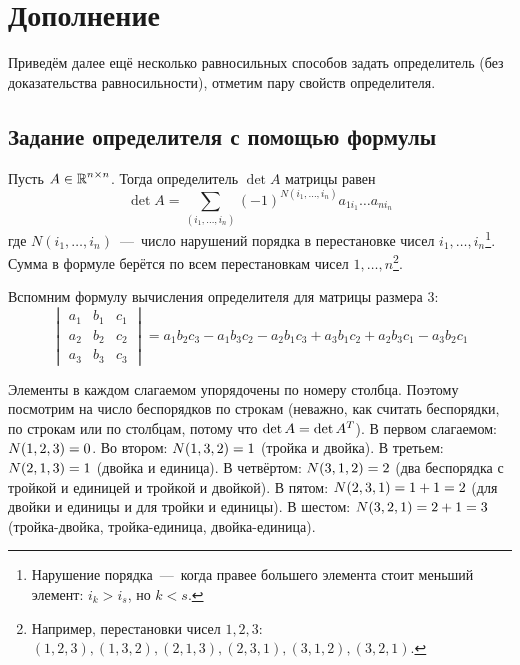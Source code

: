 \documentclass[a4paper,12pt]{article}
\begin{document}
  
  \newpage
  
  
  \section{Дополнение}
  
  Приведём далее ещё несколько равносильных способов задать определитель (без доказательства равносильности), отметим пару свойств определителя.
  
  \subsection{Задание определителя с помощью формулы}
  
  \begin{theorem}\label{theor:complete-expansion}
    Пусть $A \in \operatorname{\mathbb R}^{n \times n}$.
    Тогда определитель $\det A$ матрицы равен
    \begin{equation}
      \label{eq:complete-expansion}
      \det A = \sum_{(i_1, \ldots, i_n)} (-1)^{N(i_1, \ldots, i_n)} a_{1 i_1} \ldots a_{n i_n}
    \end{equation}
    где $N(i_1, \ldots, i_n)$~---~число нарушений порядка в перестановке чисел $i_1, \ldots, i_n$\footnote{Нарушение порядка~---~когда правее большего элемента стоит меньший элемент: $i_k > i_s$, но $k < s$.}.
    Сумма в формуле берётся по всем перестановкам чисел $1, \ldots, n$\footnote{Например, перестановки чисел $1, 2, 3$: $(1, 2, 3), (1, 3, 2), (2, 1, 3), (2, 3, 1), (3, 1, 2), (3, 2, 1)$.}.
  \end{theorem}
  
  \begin{example}
    Вспомним формулу вычисления определителя для матрицы размера $3$:
    \begin{equation*}
      \begin{vmatrix}
        a_1 & b_1 & c_1\\
        a_2 & b_2 & c_2\\
        a_3 & b_3 & c_3
      \end{vmatrix}
        = a_1 b_2 c_3 - a_1 b_3 c_2 - a_2 b_1 c_3 + a_3 b_1 c_2 + a_2 b_3 c_1 - a_3 b_2 c_1
    \end{equation*}
    
    Элементы в каждом слагаемом упорядочены по номеру столбца.
    Поэтому посмотрим на число беспорядков по строкам (неважно, как считать беспорядки, по строкам или по столбцам, потому что $\det A \hm= \det A^T$).
    В первом слагаемом: $N(1, 2, 3) \hm= 0$.
    Во втором: $N(1, 3, 2) \hm= 1$ (тройка и двойка).
    В третьем: $N(2, 1, 3) \hm= 1$ (двойка и единица).
    В четвёртом: $N(3, 1, 2) \hm= 2$ (два беспорядка с тройкой и единицей и тройкой и двойкой).
    В пятом: $N(2, 3, 1) \hm= 1 \hm+ 1 \hm= 2$ (для двойки и единицы и для тройки и единицы).
    В шестом: $N(3, 2, 1) \hm= 2 \hm+ 1 \hm= 3$ (тройка-двойка, тройка-единица, двойка-единица).
  \end{example}
  
\end{document}
